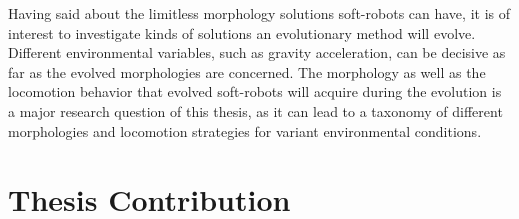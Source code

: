 Having said about the limitless morphology solutions soft-robots can have, it is of interest to investigate kinds of solutions an evolutionary method will evolve. Different environmental variables, such as gravity acceleration, can be decisive as far as the evolved morphologies are concerned. The morphology as well as the locomotion behavior that evolved soft-robots will acquire during the evolution is a major research question of this thesis, as it can lead to a taxonomy of different morphologies and locomotion strategies for variant environmental conditions.



\section{Thesis Contribution}

